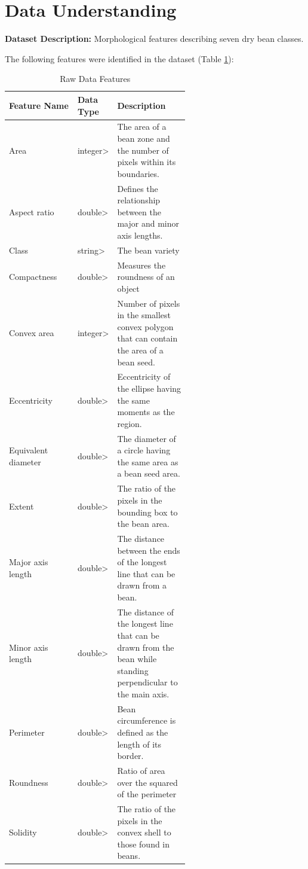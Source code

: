 \documentclass[sigconf]{acmart}
\begin{document}
\section{Data Understanding}
\textbf{Dataset Description:} Morphological features describing seven dry bean classes.

The following features were identified in the dataset (Table \ref{tab:features}):

\begin{table}[h]
  \caption{Raw Data Features}
  \label{tab:features}
  \begin{tabular}{lp{0.2\linewidth}p{0.4\linewidth}}
    \toprule
    \textbf{Feature Name} & \textbf{Data Type} & \textbf{Description} \\
    \midrule
    Area & integer> & The area of a bean zone and the number of pixels within its boundaries. \\
    Aspect ratio & double> & Defines the relationship between the major and minor axis lengths. \\
    Class & string> & The bean variety \\
    Compactness & double> & Measures the roundness of an object \\
    Convex area & integer> & Number of pixels in the smallest convex polygon that can contain the area of a bean seed. \\
    Eccentricity & double> & Eccentricity of the ellipse having the same moments as the region. \\
    Equivalent diameter & double> & The diameter of a circle having the same area as a bean seed area. \\
    Extent & double> & The ratio of the pixels in the bounding box to the bean area. \\
    Major axis length & double> & The distance between the ends of the longest line that can be drawn from a bean. \\
    Minor axis length & double> & The distance of the longest line that can be drawn from the bean while standing perpendicular to the main axis. \\
    Perimeter & double> & Bean circumference is defined as the length of its border. \\
    Roundness & double> & Ratio of area over the squared of the perimeter \\
    Solidity & double> & The ratio of the pixels in the convex shell to those found in beans. \\
    \bottomrule
  \end{tabular}
\end{table}
\end{document}

